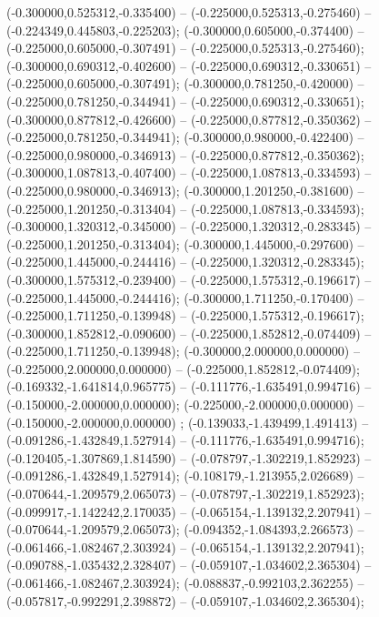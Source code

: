  (-0.300000,0.525312,-0.335400) -- (-0.225000,0.525313,-0.275460) -- (-0.224349,0.445803,-0.225203);
 (-0.300000,0.605000,-0.374400) -- (-0.225000,0.605000,-0.307491) -- (-0.225000,0.525313,-0.275460);
 (-0.300000,0.690312,-0.402600) -- (-0.225000,0.690312,-0.330651) -- (-0.225000,0.605000,-0.307491);
 (-0.300000,0.781250,-0.420000) -- (-0.225000,0.781250,-0.344941) -- (-0.225000,0.690312,-0.330651);
 (-0.300000,0.877812,-0.426600) -- (-0.225000,0.877812,-0.350362) -- (-0.225000,0.781250,-0.344941);
 (-0.300000,0.980000,-0.422400) -- (-0.225000,0.980000,-0.346913) -- (-0.225000,0.877812,-0.350362);
 (-0.300000,1.087813,-0.407400) -- (-0.225000,1.087813,-0.334593) -- (-0.225000,0.980000,-0.346913);
 (-0.300000,1.201250,-0.381600) -- (-0.225000,1.201250,-0.313404) -- (-0.225000,1.087813,-0.334593);
 (-0.300000,1.320312,-0.345000) -- (-0.225000,1.320312,-0.283345) -- (-0.225000,1.201250,-0.313404);
 (-0.300000,1.445000,-0.297600) -- (-0.225000,1.445000,-0.244416) -- (-0.225000,1.320312,-0.283345);
 (-0.300000,1.575312,-0.239400) -- (-0.225000,1.575312,-0.196617) -- (-0.225000,1.445000,-0.244416);
 (-0.300000,1.711250,-0.170400) -- (-0.225000,1.711250,-0.139948) -- (-0.225000,1.575312,-0.196617);
 (-0.300000,1.852812,-0.090600) -- (-0.225000,1.852812,-0.074409) -- (-0.225000,1.711250,-0.139948);
 (-0.300000,2.000000,0.000000) -- (-0.225000,2.000000,0.000000) -- (-0.225000,1.852812,-0.074409);
 (-0.169332,-1.641814,0.965775) -- (-0.111776,-1.635491,0.994716) -- (-0.150000,-2.000000,0.000000);
 (-0.225000,-2.000000,0.000000) -- (-0.150000,-2.000000,0.000000) ;
 (-0.139033,-1.439499,1.491413) -- (-0.091286,-1.432849,1.527914) -- (-0.111776,-1.635491,0.994716);
 (-0.120405,-1.307869,1.814590) -- (-0.078797,-1.302219,1.852923) -- (-0.091286,-1.432849,1.527914);
 (-0.108179,-1.213955,2.026689) -- (-0.070644,-1.209579,2.065073) -- (-0.078797,-1.302219,1.852923);
 (-0.099917,-1.142242,2.170035) -- (-0.065154,-1.139132,2.207941) -- (-0.070644,-1.209579,2.065073);
 (-0.094352,-1.084393,2.266573) -- (-0.061466,-1.082467,2.303924) -- (-0.065154,-1.139132,2.207941);
 (-0.090788,-1.035432,2.328407) -- (-0.059107,-1.034602,2.365304) -- (-0.061466,-1.082467,2.303924);
 (-0.088837,-0.992103,2.362255) -- (-0.057817,-0.992291,2.398872) -- (-0.059107,-1.034602,2.365304);
